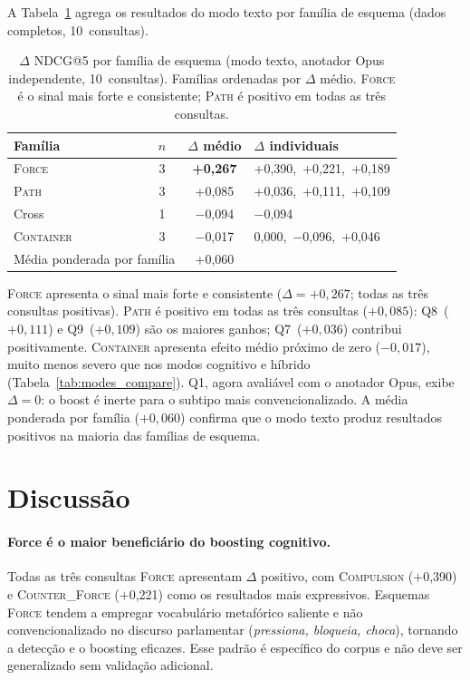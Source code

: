 \documentclass[11pt,a4paper]{article}
\begin{document}
A Tabela~\ref{tab:schema} agrega os resultados do modo texto por
família de esquema (dados completos, 10~consultas).

\begin{table}[H]
\centering
\small
\setlength{\tabcolsep}{4pt}
\begin{tabular}{lccp{4.2cm}}
\toprule
\textbf{Família} & \textbf{$n$} & \textbf{$\Delta$ médio} & \textbf{$\Delta$ individuais} \\
\midrule
\textsc{Force}     & 3 & \textbf{+0,267} & +0,390,\ +0,221,\ +0,189 \\
\textsc{Path}      & 3 & +0,085          & +0,036,\ +0,111,\ +0,109 \\
Cross              & 1 & $-$0,094        & $-$0,094 \\
\textsc{Container} & 3 & $-$0,017        & 0,000,\ $-$0,096,\ +0,046 \\
\midrule
\multicolumn{2}{l}{Média ponderada por família} & +0,060 & \\
\bottomrule
\end{tabular}
\caption{$\Delta$ NDCG@5 por família de esquema (modo texto,
  anotador Opus independente, 10~consultas).
  Famílias ordenadas por $\Delta$ médio. \textsc{Force} é o sinal
  mais forte e consistente; \textsc{Path} é positivo em todas as
  três consultas.}
\label{tab:schema}
\end{table}

\textsc{Force} apresenta o sinal mais forte e consistente
($\Delta = +0{,}267$; todas as três consultas positivas).
\textsc{Path} é positivo em todas as três consultas ($+0{,}085$):
Q8~($+0{,}111$) e Q9~($+0{,}109$) são os maiores ganhos;
Q7~($+0{,}036$) contribui positivamente.
\textsc{Container} apresenta efeito médio próximo de zero ($-0{,}017$),
muito menos severo que nos modos cognitivo e híbrido
(Tabela~\ref{tab:modes_compare}).
Q1, agora avaliável com o anotador Opus, exibe $\Delta{=}0$:
o boost é inerte para o subtipo mais convencionalizado.
A média ponderada por família ($+0{,}060$) confirma que o modo texto
produz resultados positivos na maioria das famílias de esquema.

\section{Discussão}
\label{sec:discussion}

\paragraph{Force é o maior beneficiário do boosting cognitivo.}
Todas as três consultas \textsc{Force} apresentam $\Delta$ positivo,
com \textsc{Compulsion} ($+$0,390) e \textsc{Counter\_Force}
($+$0,221) como os resultados mais expressivos.
Esquemas \textsc{Force} tendem a empregar vocabulário metafórico
saliente e não convencionalizado no discurso parlamentar
(\emph{pressiona, bloqueia, choca}), tornando a detecção e o boosting
eficazes.
Esse padrão é específico do corpus e não deve ser generalizado sem
validação adicional.
\end{document}
